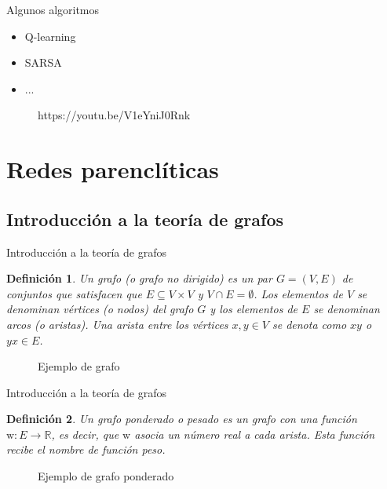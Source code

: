 \documentclass[hyperref={unicode}]{beamer}
\newtheorem{defi}{\textbf{\color{ExecusharesBlue}Definición}}
\begin{document}
\begin{frame}{Algunos algoritmos}
	\begin{minipage}{0.3\textwidth}
		\begin{itemize}
			\item Q-learning
			\item SARSA
			\item ...
		\end{itemize}
	\end{minipage}
	\hfill
	\begin{minipage}{0.65\textwidth}
		\begin{figure}[htbp!]
			\centering
			\caption{https://youtu.be/V1eYniJ0Rnk}
		\end{figure}
	\end{minipage}
\end{frame}

\section{Redes parenclíticas}
\subsection{Introducción a la teoría de grafos}
\begin{frame}{Introducción a la teoría de grafos}
	\begin{defi}
		Un grafo (o grafo no dirigido) es un par $G = (V,E)$ de conjuntos que satisfacen que $E \subseteq V\times V$ y $V \cap E = \emptyset$. Los elementos de $V$ se denominan vértices (o nodos) del grafo $G$ y los elementos de $E$ se denominan arcos (o aristas). Una arista entre los vértices $x, y \in V$ se denota como $xy$ o $yx \in E$.
	\end{defi}
	
	\begin{figure}[htb]
		\centering
		\resizebox{0.25\textheight}{!}{\ejemplografo}
		\caption{Ejemplo de grafo}
		\label{fig:grafo}
	\end{figure}
\end{frame}

\begin{frame}{Introducción a la teoría de grafos}
	\begin{defi}

			Un grafo ponderado o pesado es un grafo con una función $\mathrm{w} : E \to \mathbb{R}$, es decir, que $\mathrm{w}$ asocia un número real a cada arista. Esta función recibe el nombre de función peso.

	\end{defi}
	
	\begin{figure}[htb]
		\centering
		\resizebox{0.7\textheight}{!}{\ejemplografoponderado}
		\caption{Ejemplo de grafo ponderado}
		\label{fig:grafo_ponderado}
	\end{figure}
\end{frame}
\end{document}
